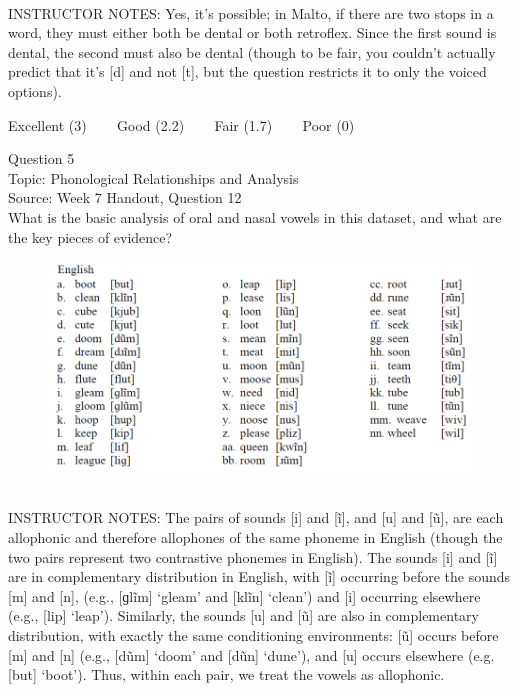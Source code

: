 \documentclass[12pt]{article}
\begin{document}
~\\
INSTRUCTOR NOTES: Yes, it's possible; in Malto, if there are two stops in a word, they must either both be dental or both retroflex. Since the first sound is dental, the second must also be dental (though to be fair, you couldn't actually predict that it's [d] and not [t], but the question restricts it to only the voiced options).


\vfill
Excellent (3) ~~~ Good (2.2) ~~~ Fair (1.7) ~~~ Poor (0)
\newpage

{\large Question 5}\\

Topic: Phonological Relationships and Analysis\\
Source: Week 7 Handout, Question 12\\

What is the basic analysis of oral and nasal vowels in this dataset, and what are the key pieces of evidence?\\

\begin{figure}[H]
\includegraphics{../images/english12.png}
\end{figure}

~\\
INSTRUCTOR NOTES: The pairs of sounds [i] and [ĩ], and [u] and [ũ], are each allophonic and therefore allophones of the same phoneme in English (though the two pairs represent two contrastive phonemes in English). The sounds [i] and [ĩ] are in complementary distribution in English, with [ĩ] occurring before the sounds [m] and [n], (e.g., [ɡlĩm] ‘gleam’ and [klĩn] ‘clean’) and [i] occurring elsewhere (e.g., [lip] ‘leap’). Similarly, the sounds [u] and [ũ] are also in complementary distribution, with exactly the same conditioning environments: [ũ] occurs before [m] and [n] (e.g., [dũm] ‘doom’ and [dũn] ‘dune’), and [u] occurs elsewhere (e.g. [but] ‘boot’). Thus, within each pair, we treat the vowels as allophonic. 
\end{document}
